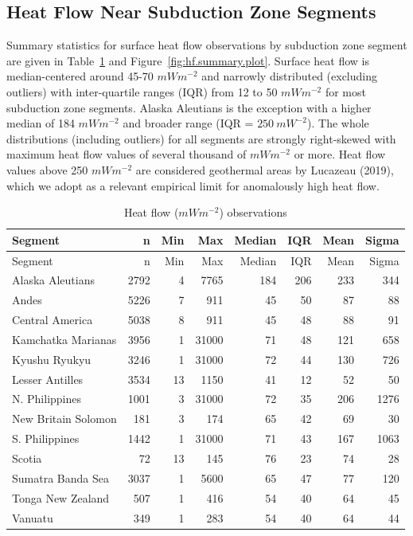 \documentclass[draft,linenumbers]{agujournal2018}
\begin{document}
\subsection{Heat Flow Near Subduction Zone Segments}

Summary statistics for surface heat flow observations by subduction zone
segment are given in Table~\ref{tbl:hf.summary.table} and
Figure~\ref{fig:hf.summary.plot}. Surface heat flow is median-centered
around 45-70 \(mWm^{-2}\) and narrowly distributed (excluding outliers)
with inter-quartile ranges (IQR) from 12 to 50 \(mWm^{-2}\) for most
subduction zone segments. Alaska Aleutians is the exception with a
higher median of 184 \(mWm^{-2}\) and broader range (IQR =
\(250~mW^{-2}\)). The whole distributions (including outliers) for all
segments are strongly right-skewed with maximum heat flow values of
several thousand of \(mWm^{-2}\) or more. Heat flow values above 250
\(mWm^{-2}\) are considered geothermal areas by Lucazeau (2019), which
we adopt as a relevant empirical limit for anomalously high heat flow.

\hypertarget{tbl:hf.summary.table}{}
\begin{longtable}[]{@{}lrrrrrrr@{}}
\caption{\label{tbl:hf.summary.table}Heat flow (\(mWm^{-2}\))
observations}\tabularnewline
\toprule
Segment & n & Min & Max & Median & IQR & Mean & Sigma \\
\midrule
\endfirsthead
\toprule
Segment & n & Min & Max & Median & IQR & Mean & Sigma \\
\midrule
\endhead
Alaska Aleutians & 2792 & 4 & 7765 & 184 & 206 & 233 & 344 \\
Andes & 5226 & 7 & 911 & 45 & 50 & 87 & 88 \\
Central America & 5038 & 8 & 911 & 45 & 48 & 88 & 91 \\
Kamchatka Marianas & 3956 & 1 & 31000 & 71 & 48 & 121 & 658 \\
Kyushu Ryukyu & 3246 & 1 & 31000 & 72 & 44 & 130 & 726 \\
Lesser Antilles & 3534 & 13 & 1150 & 41 & 12 & 52 & 50 \\
N. Philippines & 1001 & 3 & 31000 & 72 & 35 & 206 & 1276 \\
New Britain Solomon & 181 & 3 & 174 & 65 & 42 & 69 & 30 \\
S. Philippines & 1442 & 1 & 31000 & 71 & 43 & 167 & 1063 \\
Scotia & 72 & 13 & 145 & 76 & 23 & 74 & 28 \\
Sumatra Banda Sea & 3037 & 1 & 5600 & 65 & 47 & 77 & 120 \\
Tonga New Zealand & 507 & 1 & 416 & 54 & 40 & 64 & 45 \\
Vanuatu & 349 & 1 & 283 & 54 & 40 & 64 & 44 \\
\bottomrule
\end{longtable}
\end{document}
